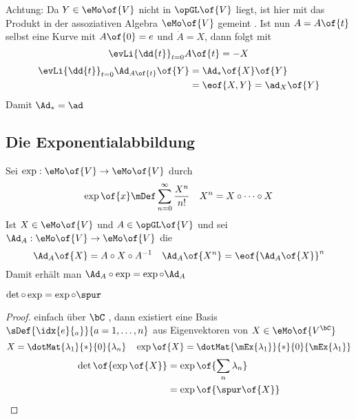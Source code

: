 Achtung: Da $Y \in \eMo\of{V}$ \iall nicht in $\opGL\of{V}$ liegt, ist hier mit \qt{$\cdot$} das Produkt in der assoziativen Algebra $\eMo\of{V}$ gemeint . Ist nun $A = A\of{t}$ selbst eine Kurve mit $A\of{0} = e$ und $\dot{A} = X$, dann folgt mit 
\begin{equation}
	\evLi{\dd{t}}_{t=0}A\of{t} = - X
\end{equation}
\begin{equation}
	\begin{split}
		\evLi{\dd{t}}_{t=0} \Ad_{A\of{t}} \of{Y} & = \Ad_{*} \of{X}\of{Y} \\
		& = \eof{X,Y} = \ad_X\of{Y}
	\end{split}
\end{equation}
Damit $\Ad_{*} = \ad$

\subsection{Die Exponentialabbildung}
Sei $\exp : \eMo\of{V} \to \eMo\of{V}$  durch 
\begin{equation}
	\exp\of{x} \mDef \sum\limits_{n=0}^\infty \frac{X^n}{n!} \quad X^n = X \circ \dots \circ X
\end{equation}
Ist $X \in \eMo\of{V}$ und $A \in \opGL\of{V}$ und sei $\Ad_A : \eMo\of{V} \to \eMo\of{V}$ die \abb 
\begin{equation}
	\Ad_A\of{X} = A \circ X \circ A^{-1} \quad \Ad_A\of{X^n} = \eof{\Ad_A\of{X}}^n
\end{equation}
Damit erhält man $\Ad_A \circ \exp = \exp \circ \Ad_A$
\begin{proposition}
	$\det\circ \exp = \exp \circ \spur$
\end{proposition}
\begin{proof}
 	einfach über $\bC$ , dann existiert eine Basis $\sDef{\idx{e}{_a}}{a = 1,\dots,n}$ aus Eigenvektoren von $X \in \eMo\of{V^{\bC}}$
 	\begin{equation}
 		X = \dotMat{\lambda_1}{*}{0}{\lambda_n} \quad \exp\of{X} = \dotMat{\mEx{\lambda_1}}{*}{0}{\mEx{\lambda_1}}
 	\end{equation}
 	\begin{equation}
 		\begin{split}
 			\det\of{\exp\of{X}} & = \exp\of{\sum\limits_n \lambda_n} \\
 			& = \exp\of{\spur\of{X}}
 		\end{split}
 	\end{equation}
\end{proof}
